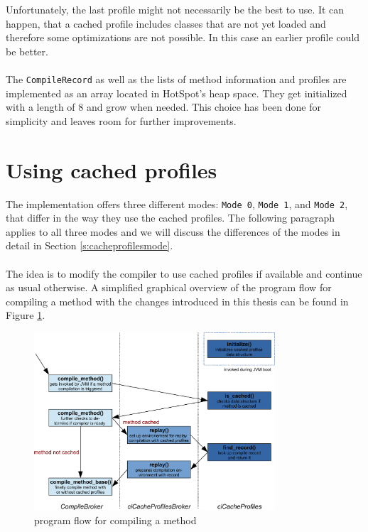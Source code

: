 Unfortunately, the last profile might not necessarily be the best to use. It can happen, that a cached profile includes classes that are not yet loaded and therefore some optimizations are not possible. In this case an earlier profile could be better.
\\\\
The \texttt{CompileRecord} as well as the lists of method information and profiles are implemented as an array located in HotSpot's heap space.
They get initialized with a length of 8 and grow when needed. This choice has been done for simplicity and leaves room for further improvements.

\section{Using cached profiles}
\label{s:usingprofiles}
The implementation offers three different modes: \texttt{Mode 0}, \texttt{Mode 1}, and \texttt{Mode 2}, that differ in the way they use the cached profiles.
The following paragraph applies to all three modes and we will discuss the differences of the modes in detail in Section \ref{s:cacheprofilesmode}.
\\\\
The idea is to modify the compiler to use cached profiles if available and continue as usual otherwise.
A simplified graphical overview of the program flow for compiling a method with the changes introduced in this thesis can be found in Figure \ref{f:programflow}.
\begin{figure}[ht!]
  \begin{center}
    \centering
    \includegraphics[width=0.8\textwidth]{figures/program_flow.png}
    \caption{program flow for compiling a method}
    \label{f:programflow}
  \end{center}
\end{figure}\\
